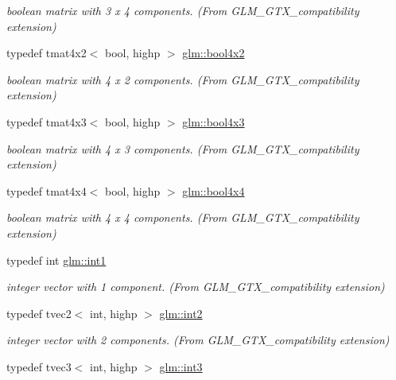 \begin{DoxyCompactItemize}
\begin{DoxyCompactList}\small\item\em boolean matrix with 3 x 4 components. (From G\+L\+M\+\_\+\+G\+T\+X\+\_\+compatibility extension) \end{DoxyCompactList}\item 
typedef tmat4x2$<$ bool, highp $>$ \hyperlink{group__gtx__compatibility_ga2d956a9ea3d4c8e8ec12797c9d7cb677}{glm\+::bool4x2}
\begin{DoxyCompactList}\small\item\em boolean matrix with 4 x 2 components. (From G\+L\+M\+\_\+\+G\+T\+X\+\_\+compatibility extension) \end{DoxyCompactList}\item 
typedef tmat4x3$<$ bool, highp $>$ \hyperlink{group__gtx__compatibility_gafd85fa864c89a6b1b4887d2790132c5c}{glm\+::bool4x3}
\begin{DoxyCompactList}\small\item\em boolean matrix with 4 x 3 components. (From G\+L\+M\+\_\+\+G\+T\+X\+\_\+compatibility extension) \end{DoxyCompactList}\item 
typedef tmat4x4$<$ bool, highp $>$ \hyperlink{group__gtx__compatibility_gafd4a5a69fab4d76f91ee75684f3bf2f1}{glm\+::bool4x4}
\begin{DoxyCompactList}\small\item\em boolean matrix with 4 x 4 components. (From G\+L\+M\+\_\+\+G\+T\+X\+\_\+compatibility extension) \end{DoxyCompactList}\item 
typedef int \hyperlink{group__gtx__compatibility_gaba41d7803e4b24c17656d74377b88286}{glm\+::int1}
\begin{DoxyCompactList}\small\item\em integer vector with 1 component. (From G\+L\+M\+\_\+\+G\+T\+X\+\_\+compatibility extension) \end{DoxyCompactList}\item 
typedef tvec2$<$ int, highp $>$ \hyperlink{group__gtx__compatibility_ga89f98d125d3e73b50e34bc35d93796f1}{glm\+::int2}
\begin{DoxyCompactList}\small\item\em integer vector with 2 components. (From G\+L\+M\+\_\+\+G\+T\+X\+\_\+compatibility extension) \end{DoxyCompactList}\item 
typedef tvec3$<$ int, highp $>$ \hyperlink{group__gtx__compatibility_gafc297ec294f5aa0360a634656c20e1d0}{glm\+::int3}

\end{DoxyCompactItemize}
